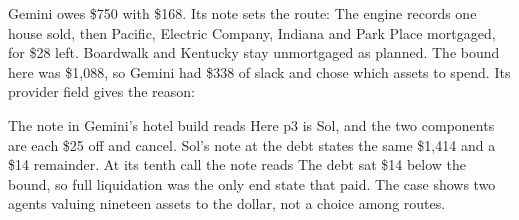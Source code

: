  Gemini owes \$750 with \$168. Its note sets the route:
The engine records one house sold, then Pacific, Electric Company, Indiana and Park Place mortgaged, for \$28 left. Boardwalk and Kentucky stay unmortgaged as planned. The bound here was \$1,088, so Gemini had \$338 of slack and chose which assets to spend. Its provider field gives the reason: 

 The note in Gemini's hotel build reads  Here p3 is Sol, and the two components are each \$25 off and cancel. Sol's note at the debt states the same \$1,414 and a \$14 remainder. At its tenth call the note reads  The debt sat \$14 below the bound, so full liquidation was the only end state that paid. The case shows two agents valuing nineteen assets to the dollar, not a choice among routes.
